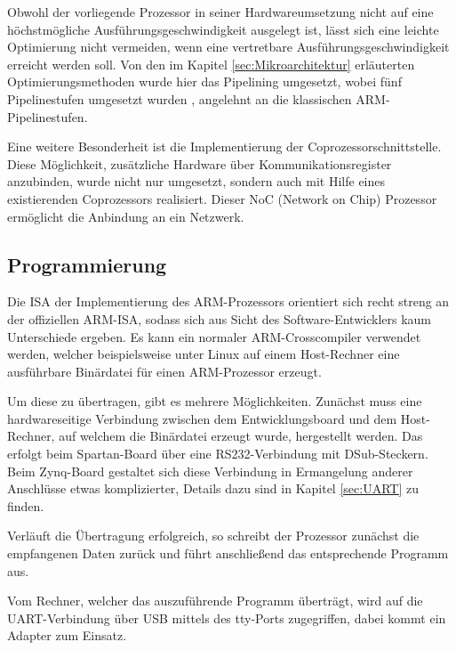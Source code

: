 \documentclass[11pt,a4paper,titlepage]{article}
\begin{document}
Obwohl der vorliegende Prozessor in seiner Hardwareumsetzung nicht auf eine höchstmögliche Ausführungsgeschwindigkeit ausgelegt ist, lässt sich eine leichte Optimierung nicht vermeiden, wenn eine vertretbare Ausführungsgeschwindigkeit erreicht werden soll. Von den im Kapitel \ref{sec:Mikroarchitektur} erläuterten Optimierungsmethoden wurde hier das Pipelining umgesetzt, wobei fünf Pipelinestufen umgesetzt wurden \cite[S. 80]{Boehme}, angelehnt an die klassischen ARM-Pipelinestufen.

Eine weitere Besonderheit ist die Implementierung der Coprozessorschnittstelle. Diese Möglichkeit, zusätzliche Hardware über Kommunikationsregister anzubinden, wurde nicht nur umgesetzt, sondern auch mit Hilfe eines existierenden Coprozessors realisiert. Dieser NoC (Network on Chip) Prozessor ermöglicht die Anbindung an ein Netzwerk.

\subsection{Programmierung}
\label{sec:ArmProg}

Die ISA der Implementierung des ARM-Prozessors orientiert sich recht streng an der offiziellen ARM-ISA, sodass sich aus Sicht des Software-Entwicklers kaum Unterschiede ergeben. Es kann ein normaler ARM-Crosscompiler verwendet werden, welcher beispielsweise unter Linux auf einem Host-Rechner eine ausführbare Binärdatei für einen ARM-Prozessor erzeugt.

Um diese zu übertragen, gibt es mehrere Möglichkeiten. Zunächst muss eine hardwareseitige Verbindung zwischen dem Entwicklungsboard und dem Host-Rechner, auf welchem die Binärdatei erzeugt wurde, hergestellt werden. Das erfolgt beim Spartan-Board über eine RS232-Verbindung mit DSub-Steckern. Beim Zynq-Board gestaltet sich diese Verbindung in Ermangelung anderer Anschlüsse etwas komplizierter, Details dazu sind in Kapitel \ref{sec:UART} zu finden.

Verläuft die Übertragung erfolgreich, so schreibt der Prozessor zunächst die empfangenen Daten zurück und führt anschließend das entsprechende Programm aus.

Vom Rechner, welcher das auszuführende Programm überträgt, wird auf die UART-Verbindung über USB mittels des tty-Ports zugegriffen, dabei kommt ein Adapter zum Einsatz.
\end{document}
